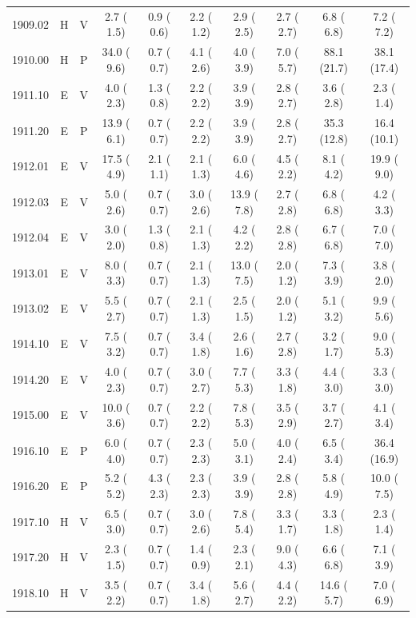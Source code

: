 \documentclass[11pt,twocolumn]{article}
\begin{document}
\begin{table}[]
{\begin{tabular}{cccccccccc}
1909.02 & H & V &  2.7 ( 1.5) &  0.9 ( 0.6) &  2.2 ( 1.2) &  2.9 ( 2.5) &  2.7 ( 2.7) &  6.8 ( 6.8) &  7.2 ( 7.2)  \\
1910.00 & H & P & 34.0 ( 9.6) &  0.7 ( 0.7) &  4.1 ( 2.6) &  4.0 ( 3.9) &  7.0 ( 5.7) & 88.1 (21.7) & 38.1 (17.4)  \\
1911.10 & E & V &  4.0 ( 2.3) &  1.3 ( 0.8) &  2.2 ( 2.2) &  3.9 ( 3.9) &  2.8 ( 2.7) &  3.6 ( 2.8) &  2.3 ( 1.4)  \\
1911.20 & E & P & 13.9 ( 6.1) &  0.7 ( 0.7) &  2.2 ( 2.2) &  3.9 ( 3.9) &  2.8 ( 2.7) & 35.3 (12.8) & 16.4 (10.1)  \\
1912.01 & E & V & 17.5 ( 4.9) &  2.1 ( 1.1) &  2.1 ( 1.3) &  6.0 ( 4.6) &  4.5 ( 2.2) &  8.1 ( 4.2) & 19.9 ( 9.0)  \\
1912.03 & E & V &  5.0 ( 2.6) &  0.7 ( 0.7) &  3.0 ( 2.6) & 13.9 ( 7.8) &  2.7 ( 2.8) &  6.8 ( 6.8) &  4.2 ( 3.3)  \\
1912.04 & E & V &  3.0 ( 2.0) &  1.3 ( 0.8) &  2.1 ( 1.3) &  4.2 ( 2.2) &  2.8 ( 2.8) &  6.7 ( 6.8) &  7.0 ( 7.0)  \\
1913.01 & E & V &  8.0 ( 3.3) &  0.7 ( 0.7) &  2.1 ( 1.3) & 13.0 ( 7.5) &  2.0 ( 1.2) &  7.3 ( 3.9) &  3.8 ( 2.0)  \\
1913.02 & E & V &  5.5 ( 2.7) &  0.7 ( 0.7) &  2.1 ( 1.3) &  2.5 ( 1.5) &  2.0 ( 1.2) &  5.1 ( 3.2) &  9.9 ( 5.6)  \\
1914.10 & E & V &  7.5 ( 3.2) &  0.7 ( 0.7) &  3.4 ( 1.8) &  2.6 ( 1.6) &  2.7 ( 2.8) &  3.2 ( 1.7) &  9.0 ( 5.3)  \\
1914.20 & E & V &  4.0 ( 2.3) &  0.7 ( 0.7) &  3.0 ( 2.7) &  7.7 ( 5.3) &  3.3 ( 1.8) &  4.4 ( 3.0) &  3.3 ( 3.0)  \\
1915.00 & E & V & 10.0 ( 3.6) &  0.7 ( 0.7) &  2.2 ( 2.2) &  7.8 ( 5.3) &  3.5 ( 2.9) &  3.7 ( 2.7) &  4.1 ( 3.4)  \\
1916.10 & E & P &  6.0 ( 4.0) &  0.7 ( 0.7) &  2.3 ( 2.3) &  5.0 ( 3.1) &  4.0 ( 2.4) &  6.5 ( 3.4) & 36.4 (16.9)  \\
1916.20 & E & P &  5.2 ( 5.2) &  4.3 ( 2.3) &  2.3 ( 2.3) &  3.9 ( 3.9) &  2.8 ( 2.8) &  5.8 ( 4.9) & 10.0 ( 7.5)  \\
1917.10 & H & V &  6.5 ( 3.0) &  0.7 ( 0.7) &  3.0 ( 2.6) &  7.8 ( 5.4) &  3.3 ( 1.7) &  3.3 ( 1.8) &  2.3 ( 1.4)  \\
1917.20 & H & V &  2.3 ( 1.5) &  0.7 ( 0.7) &  1.4 ( 0.9) &  2.3 ( 2.1) &  9.0 ( 4.3) &  6.6 ( 6.8) &  7.1 ( 3.9)  \\
1918.10 & H & V &  3.5 ( 2.2) &  0.7 ( 0.7) &  3.4 ( 1.8) &  5.6 ( 2.7) &  4.4 ( 2.2) & 14.6 ( 5.7) &  7.0 ( 6.9)  \\

\end{tabular}}
\end{table}
\end{document}
